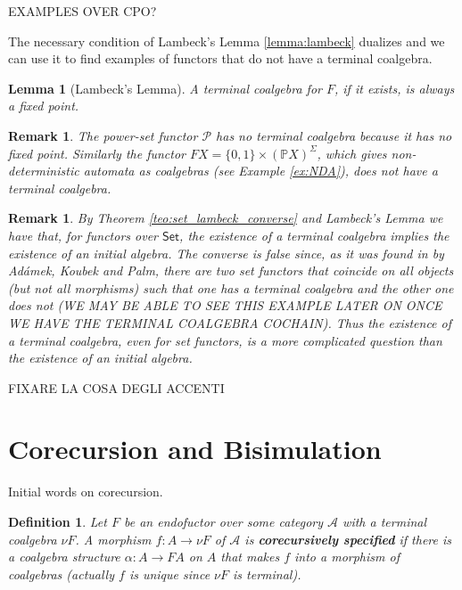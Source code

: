 \documentclass[letterpaper, 11pt, oneside]{memoir}
\theoremstyle{myteo}
\newtheorem{lemma}[theorem]{Lemma}
\newtheorem{definition}[theorem]{Definition}
\newtheorem{remark}[theorem]{Remark}
\numberwithin{equation}{section}
\newcommand{\marginnote}[1]{\marginpar{\footnotesize #1}}
\newcommand{\Set}{\textsf{Set}}
\newcommand{\A}{\mathscr{A}}
\begin{document}
EXAMPLES OVER CPO?

The necessary condition of Lambeck's Lemma \ref{lemma:lambeck} dualizes and we can use it to find examples of functors that do not have a terminal coalgebra.

\begin{lemma}[Lambeck's Lemma]
  A terminal coalgebra for \(F\), if it exists, is always a fixed point.
\end{lemma}

\begin{remark}
  The power-set functor \(\mathcal{P}\) has no terminal coalgebra because it has no fixed point.
  Similarly the functor \(FX = \{0, 1\} \times (\mathbb{P}X)^\Sigma\), which gives non-deterministic automata as coalgebras (see Example \ref{ex:NDA}), does not have a terminal coalgebra.
\end{remark}

\begin{remark}
  By Theorem \ref{teo:set_lambeck_converse} and Lambeck's Lemma we have that, for functors over \(\Set\), the existence of a terminal coalgebra implies the existence of an initial algebra.
  The converse is false since, as it was found in \cite[Example 3.14]{Adamek-2016} by Adámek, Koubek and Palm, there are two set functors that coincide on all objects (but not all morphisms) such that one has a terminal coalgebra and the other one does not (WE MAY BE ABLE TO SEE THIS EXAMPLE LATER ON ONCE WE HAVE THE TERMINAL COALGEBRA COCHAIN).
  Thus the existence of a terminal coalgebra, even for set functors, is a more complicated question than the existence of an initial algebra.
\end{remark}

FIXARE LA COSA DEGLI ACCENTI

\section{Corecursion and Bisimulation}

Initial words on corecursion.

\begin{definition}
  Let \(F\) be an endofuctor over some category \(\A\) with a terminal coalgebra \(\nu F\).
  A morphism \(f: A \to \nu F\) of \(\A\) is \textbf{corecursively specified} \marginnote{corecursively specified morphism} if there is a coalgebra structure \(\alpha : A \to FA\) on \(A\) that makes \(f\) into a morphism of coalgebras (actually \(f\) is unique since \(\nu F\) is terminal).
\end{definition}
\end{document}
